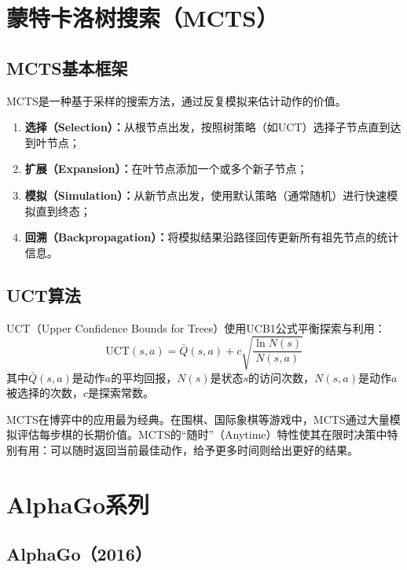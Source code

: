 \section{蒙特卡洛树搜索（MCTS） \ug}

\subsection{MCTS基本框架}

MCTS是一种基于采样的搜索方法，通过反复模拟来估计动作的价值。

\begin{algbox}[title={\textbf{MCTS四个阶段}}]
\begin{enumerate}
  \item \textbf{选择（Selection）：}从根节点出发，按照树策略（如UCT）选择子节点直到达到叶节点；
  \item \textbf{扩展（Expansion）：}在叶节点添加一个或多个新子节点；
  \item \textbf{模拟（Simulation）：}从新节点出发，使用默认策略（通常随机）进行快速模拟直到终态；
  \item \textbf{回溯（Backpropagation）：}将模拟结果沿路径回传更新所有祖先节点的统计信息。
\end{enumerate}
\end{algbox}

\subsection{UCT算法}

UCT（Upper Confidence Bounds for Trees）使用UCB1公式平衡探索与利用：
$$\mathrm{UCT}(s, a) = \bar{Q}(s, a) + c \sqrt{\frac{\ln N(s)}{N(s, a)}}$$
其中$\bar{Q}(s,a)$是动作$a$的平均回报，$N(s)$是状态$s$的访问次数，$N(s,a)$是动作$a$被选择的次数，$c$是探索常数。

\begin{appbox}[title={\textbf{应用：博弈规划}}]
MCTS在博弈中的应用最为经典。在围棋、国际象棋等游戏中，MCTS通过大量模拟评估每步棋的长期价值。MCTS的``随时''（Anytime）特性使其在限时决策中特别有用：可以随时返回当前最佳动作，给予更多时间则给出更好的结果。
\end{appbox}

\section{AlphaGo系列 \grad}

\subsection{AlphaGo（2016）}

